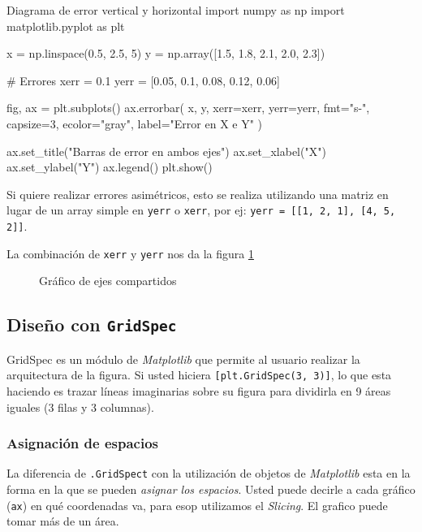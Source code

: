 \begin{pycode}{Diagrama de error vertical y horizontal}
import numpy as np
import matplotlib.pyplot as plt

x = np.linspace(0.5, 2.5, 5)
y = np.array([1.5, 1.8, 2.1, 2.0, 2.3])

# Errores
xerr = 0.1
yerr = [0.05, 0.1, 0.08, 0.12, 0.06]

fig, ax = plt.subplots()
ax.errorbar(
    x,
    y,
    xerr=xerr,
    yerr=yerr,
    fmt="s-",
    capsize=3,
    ecolor="gray",
    label="Error en X e Y"
)

ax.set_title("Barras de error en ambos ejes")
ax.set_xlabel("X")
ax.set_ylabel("Y")
ax.legend()
plt.show()    
\end{pycode}

\begin{nota}
    Si quiere realizar errores asimétricos, esto se realiza utilizando una matriz en lugar de un array simple en \texttt{yerr} o \texttt{xerr}, por ej: \texttt{yerr = [[1, 2, 1], [4, 5, 2]]}.  
\end{nota}

La combinación de \texttt{xerr} y \texttt{yerr} nos da la figura \ref{fig:grafico_diagrama_error}

\begin{figure}[ht]
    \centering
     
    \caption{Gráfico de ejes compartidos}
    \label{fig:grafico_diagrama_error}
\end{figure}



\subsection{Diseño con \texttt{GridSpec}}

GridSpec es un módulo de \textit{Matplotlib} que permite al usuario realizar la arquitectura de la figura. Si usted hiciera \texttt{[plt.GridSpec(3, 3)]}, lo que esta haciendo es trazar líneas imaginarias sobre su figura para dividirla en 9 áreas iguales (3 filas y 3 columnas).

\subsubsection{Asignación de espacios}

La diferencia de \texttt{.GridSpect} con la utilización de objetos de \textit{Matplotlib} esta en la forma en la que se pueden \textit{asignar los espacios}. Usted puede decirle a cada gráfico (\texttt{ax}) en qué coordenadas va, para esop utilizamos el \textit{Slicing}. El grafico puede tomar más de un área.

